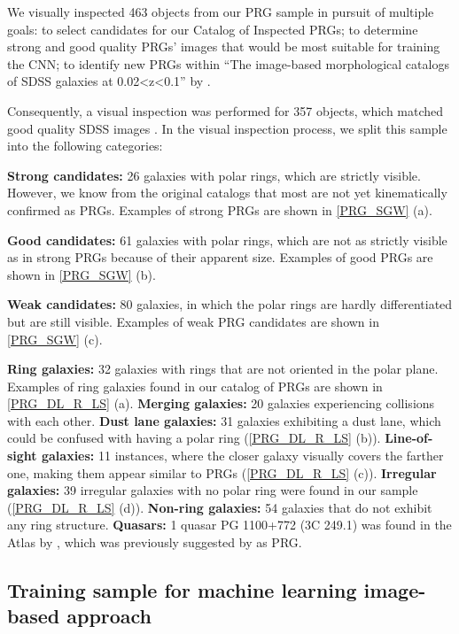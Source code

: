 \documentclass{aa}
\begin{document}
We visually inspected 463 objects from our PRG sample in pursuit of multiple goals: to select candidates for our Catalog of Inspected PRGs; to determine strong and good quality PRGs' images that would be most suitable for training the CNN; to identify new PRGs within ``The image-based morphological catalogs of SDSS galaxies at 0.02<z<0.1'' by \cite{Vavilova2021}. 

Consequently, a visual inspection was performed for 357 objects, which matched good quality SDSS images \citep{Blanton2017, Vavilova2020}. In the visual inspection process, we split this sample into the following categories: 

\textbf{Strong candidates:} 26 galaxies with polar rings, which are strictly visible. However, we know from the original catalogs that most are not yet kinematically confirmed as PRGs. Examples of strong PRGs are shown in \autoref{PRG_SGW} (a). 

\textbf{Good candidates:} 61 galaxies with polar rings, which are not as strictly visible as in strong PRGs because of their apparent size. Examples of good PRGs are shown in \autoref{PRG_SGW} (b).

\textbf{Weak candidates:} 80 galaxies, in which the polar rings are hardly differentiated but are still visible. Examples of weak PRG candidates are shown in \autoref{PRG_SGW} (c).

\textbf{Ring galaxies:} 32 galaxies with rings that are not oriented in the polar plane. Examples of ring galaxies found in our catalog of PRGs are shown in \autoref{PRG_DL_R_LS} (a). \textbf{Merging galaxies:} 20 galaxies experiencing collisions with each other. \textbf{Dust lane galaxies:} 31 galaxies exhibiting a dust lane, which could be confused with having a polar ring (\autoref{PRG_DL_R_LS} (b)). \textbf{Line-of-sight galaxies:} 11 instances, where the closer galaxy visually covers the farther one, making them appear similar to PRGs (\autoref{PRG_DL_R_LS} (c)). \textbf{Irregular galaxies:} 39 irregular galaxies with no polar ring were found in our sample (\autoref{PRG_DL_R_LS} (d)). \textbf{Non-ring galaxies: }54 galaxies that do not exhibit any ring structure. \textbf{Quasars:} 1 quasar PG 1100+772 (3C 249.1) was found in the Atlas by \cite{Whitmore1990}, which was previously suggested by \cite{Stockton1983} as PRG. 

\subsection{Training sample for machine learning image-based approach}
\end{document}
